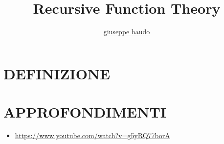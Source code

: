 \documentclass[a4paper,10pt]{article}
\title{Recursive Function Theory}
\author{\href{http://www.baudo.hol.es}{giuseppe baudo}}
\begin{document}
\maketitle

\section{DEFINIZIONE}



\section{APPROFONDIMENTI}
\begin{itemize}
 \item \url{https://www.youtube.com/watch?v=g5yRQ77borA}
\end{itemize}
\end{document}
